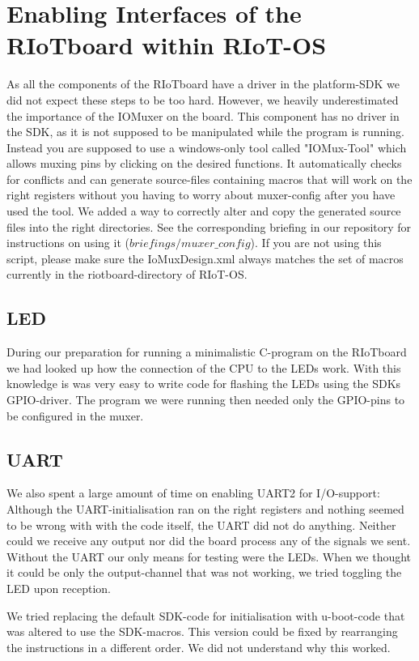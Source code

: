 \section{Enabling Interfaces of the RIoTboard within RIoT-OS}

As all the components of the RIoTboard have a driver in the platform-SDK we did not
expect these steps to be too hard. However, we heavily underestimated the importance of
the IOMuxer on the board. This component has no driver in the SDK, as it is not supposed
to be manipulated while the program is running. Instead you are supposed to use a
windows-only tool called "IOMux-Tool" which allows muxing pins by clicking on the desired
functions.
It automatically checks for conflicts and can generate source-files containing macros
that will work on the right registers without you having to worry about muxer-config
after you have used the tool.
We added a way to correctly alter and copy the generated source files into the right
directories. See the corresponding briefing in our repository for instructions on using
it (\textit{$briefings/muxer\_config$}).
If you are not using this script, please make sure the IoMuxDesign.xml always matches the
set of macros currently in the riotboard-directory of RIoT-OS.

\subsection{LED}
During our preparation for running a minimalistic C-program on the RIoTboard we had
looked up how the connection of the CPU to the LEDs work.
With this knowledge is was very easy to write code for flashing the LEDs using the SDKs
GPIO-driver.
The program we were running then needed only the GPIO-pins to be configured in the muxer.

\subsection{UART}
We also spent a large amount of time on enabling UART2 for I/O-support:
Although the UART-initialisation ran on the right registers and nothing seemed to be
wrong with with the code itself, the UART did not do anything. Neither could we receive
any output nor did the board process any of the signals we sent.
Without the UART our only means for testing were the LEDs. When we thought it could be
only the output-channel that was not working, we tried toggling the LED upon reception.

We tried replacing the default SDK-code for initialisation with u-boot-code that was
altered to use the SDK-macros. This version could be fixed by rearranging the
instructions in a different order. We did not understand why this worked.

